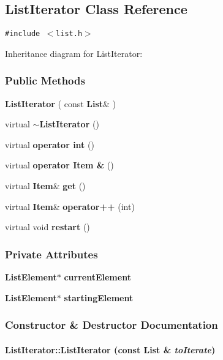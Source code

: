 \subsection{List\-Iterator  Class Reference}
\label{ListIterator}
{\tt \#include $<$list.h$>$}

Inheritance diagram for List\-Iterator:\begin{figure}[H]
\begin{center}
\leavevmode
\setlength{\epsfysize}{2cm}
\end{center}
\end{figure}
\subsubsection*{Public Methods}
\begin{CompactItemize}
\item 
{\bf List\-Iterator} ( const {\bf List}\& )
\item 
virtual {\bf $\sim$List\-Iterator} ()
\item 
virtual {\bf operator int} ()
\item 
virtual {\bf operator Item \&} ()
\item 
virtual {\bf Item}\& {\bf get} ()
\item 
virtual {\bf Item}\& {\bf operator++} (int)
\item 
virtual void {\bf restart} ()
\end{CompactItemize}
\subsubsection*{Private Attributes}
\begin{CompactItemize}
\item 
{\bf List\-Element}$\ast$ {\bf current\-Element}
\item 
{\bf List\-Element}$\ast$ {\bf starting\-Element}
\end{CompactItemize}


\subsubsection{Constructor \& Destructor Documentation}
\label{ListIterator_a0}
\paragraph{\setlength{\rightskip}{0pt plus 5cm}List\-Iterator::List\-Iterator (const {\bf List} \& {\em to\-Iterate})\hspace{0.3cm}{\tt  [inline]}}\hfill



